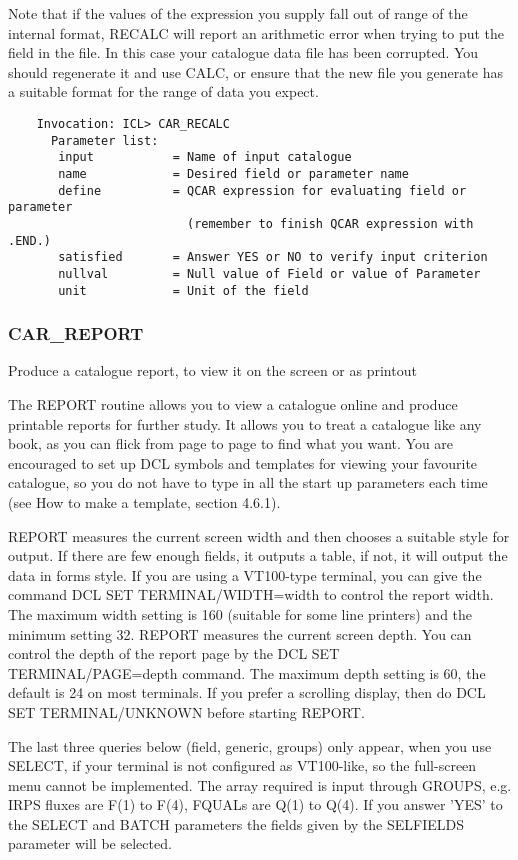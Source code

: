 Note that if the values of the expression you supply fall out of range of the 
internal format, RECALC will report an arithmetic error when trying to put 
the field in the file.  
In this case your catalogue data file has been corrupted.  
You should regenerate it and use CALC, or ensure that the new file you 
generate has a suitable format for the range of data you expect.
\begin{verbatim}
    Invocation: ICL> CAR_RECALC
      Parameter list:
       input           = Name of input catalogue
       name            = Desired field or parameter name
       define          = QCAR expression for evaluating field or parameter
                         (remember to finish QCAR expression with .END.)
       satisfied       = Answer YES or NO to verify input criterion
       nullval         = Null value of Field or value of Parameter
       unit            = Unit of the field
\end{verbatim}

\subsubsection{CAR\_REPORT}
 
Produce a catalogue report, to view it on the screen or as printout
 
The REPORT routine allows you to view a catalogue online and produce 
printable reports for further study. 
It allows you to treat a catalogue like any book, as you can flick from 
page to page to find what you want.  
You are encouraged to set up DCL symbols and templates for viewing your 
favourite catalogue, so you do not have to type in all the start up 
parameters each time (see How to make a template, section 4.6.1).

REPORT measures the current screen width and then chooses a
suitable style for output. 
If there are few enough fields, it outputs a table, if not, it will output 
the data in forms style.
If you are using a VT100-type terminal, you can give the command DCL
SET TERMINAL/WIDTH=width to control the report width. 
The maximum width setting is 160 (suitable for some line printers) and the 
minimum setting 32.
REPORT measures the current screen depth. 
You can control the depth of the report page by the DCL SET 
TERMINAL/PAGE=depth command. 
The maximum depth setting is 60, the default is 24 on most terminals.
If you prefer a scrolling display, then do DCL SET TERMINAL/UNKNOWN before 
starting REPORT.

The last three queries below (field, generic, groups) only appear, when you use
SELECT, if your terminal is not configured as VT100-like, so the full-screen 
menu cannot be implemented.
The array required is input through GROUPS, e.g. IRPS fluxes are F(1) to 
F(4), FQUALs are Q(1) to Q(4).
If you answer 'YES' to the SELECT and BATCH parameters the fields given by the
SELFIELDS parameter will be selected.

